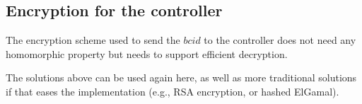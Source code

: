 \documentclass[prodmode]{acmsmall}
\newcommand{\kt}{\ensuremath{k_T}\xspace}
\newcommand{\ka}{\ensuremath{k_A}\xspace}
\newcommand{\zi}{\ensuremath{zi}\xspace}
\newcommand{\bcid}{\ensuremath{bcid}\xspace} %
\newcommand{\hash}{\ensuremath{\mathcal{H}}\xspace} %
\begin{document}
\subsection{Encryption for the controller}
\label{sec:encrypt-contr}

The encryption scheme used to send the \bcid to the controller does not
need any homomorphic property but needs to support efficient decryption.

The solutions above can be used again here, as well as more
traditional solutions if that eases the implementation (e.g., RSA
encryption, or hashed ElGamal).













\end{document}
